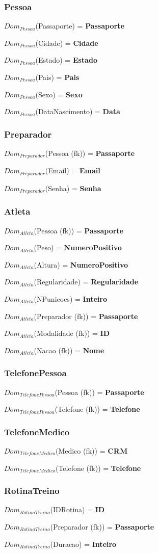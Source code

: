 \documentclass[12pt,a4paper]{article}
\newcommand{\createdomain}[3]{
    $Dom_{#1}$(#2) = {\bf #3}

}
\begin{document}
    \singlespacing
\subsubsection{Pessoa}
        \createdomain{Pessoa}{Passaporte}{\bf Passaporte}
        \createdomain{Pessoa}{Cidade}{\bf Cidade}
        \createdomain{Pessoa}{Estado}{\bf Estado}
        \createdomain{Pessoa}{Pais}{\bf Pais}
        \createdomain{Pessoa}{Sexo}{\bf Sexo}
        \createdomain{Pessoa}{DataNascimento}{\bf Data}

    \subsubsection{Preparador}
        \createdomain{Preparador}{Pessoa (fk)}{\bf Passaporte}
        \createdomain{Preparador}{Email}{\bf Email}
        \createdomain{Preparador}{Senha}{\bf Senha}

    \subsubsection{Atleta}
        \createdomain{Atleta}{Pessoa (fk)}{\bf Passaporte}
        \createdomain{Atleta}{Peso}{\bf NumeroPositivo}
        \createdomain{Atleta}{Altura}{\bf NumeroPositivo}
        \createdomain{Atleta}{Regularidade}{\bf Regularidade}
        \createdomain{Atleta}{NPunicoes}{\bf Inteiro}
        \createdomain{Atleta}{Preparador (fk)}{\bf Passaporte}
        \createdomain{Atleta}{Modalidade (fk)}{\bf ID}
        \createdomain{Atleta}{Nacao (fk)}{\bf Nome}

    \subsubsection{TelefonePessoa}
        \createdomain{TelefonePessoa}{Pessoa (fk)}{\bf Passaporte}
        \createdomain{TelefonePessoa}{Telefone (fk)}{\bf Telefone}

    \subsubsection{TelefoneMedico}
        \createdomain{TelefoneMedico}{Medico (fk)}{\bf CRM}
        \createdomain{TelefoneMedico}{Telefone (fk)}{\bf Telefone}

    \subsubsection{RotinaTreino}
        \createdomain{RotinaTreino}{IDRotina}{\bf ID}
        \createdomain{RotinaTreino}{Preparador (fk)}{\bf Passaporte}
        \createdomain{RotinaTreino}{Duracao}{\bf Inteiro}
\end{document}
